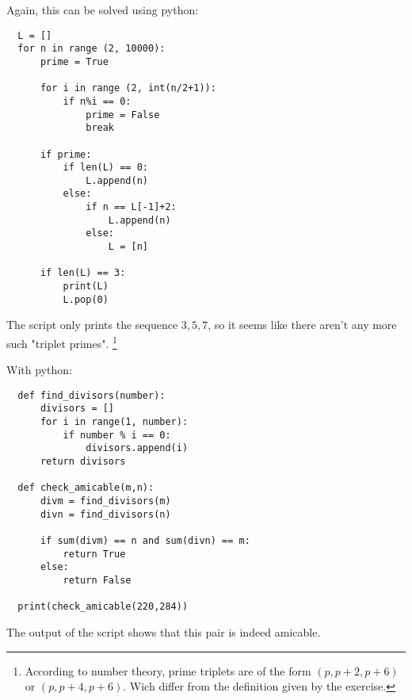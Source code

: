 \sol Again, this can be solved using python:
\begin{verbatim}
  L = []
  for n in range (2, 10000):
      prime = True

      for i in range (2, int(n/2+1)):
          if n%i == 0:
              prime = False
              break

      if prime:
          if len(L) == 0:
              L.append(n)
          else:
              if n == L[-1]+2:
                  L.append(n)
              else:
                  L = [n]

      if len(L) == 3:
          print(L)
          L.pop(0)
\end{verbatim}
The script only prints the sequence $3, 5, 7$, so it seems like there aren't any more such "triplet primes".
\footnote{
  According to number theory, prime triplets are of the form $(p, p+2, p+6)$ or $(p, p+4, p+6)$.
  Wich differ from the definition given by the exercise.
}


\sol With python:
\begin{verbatim}
  def find_divisors(number):
      divisors = []
      for i in range(1, number):
          if number % i == 0:
              divisors.append(i)
      return divisors

  def check_amicable(m,n):
      divm = find_divisors(m)
      divn = find_divisors(n)

      if sum(divm) == n and sum(divn) == m:
          return True
      else:
          return False

  print(check_amicable(220,284))
\end{verbatim}
The output of the script shows that this pair is indeed amicable.
